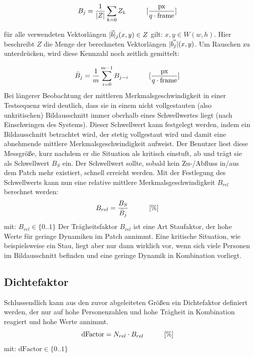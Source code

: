 \begin{equation}
B_j = \frac{1}{|Z|}\sum_{k=0}Z_k \hskip 30pt [\frac{\text{px}}{q\cdot \text{frame}}]
\end{equation}

\begin{flushleft}
für alle verwendeten Vektorlängen $\lvert\vec{b}\rvert_j(x,y)\in Z$ gilt: $x,y\in W(w,h)$.\vskip 5pt
Hier beschreibt $Z$ die Menge der berechneten Vektorlängen $\lvert\vec{b_j}\rvert(x,y)$.\vskip 5pt
Um Rauschen zu unterdrücken, wird diese Kennzahl noch zeitlich gemittelt:
\end{flushleft}
\begin{equation}
\bar{B}_j = \frac{1}{m}\sum_{i=0}^{m-1}B_{j-i} \hskip 30pt [\frac{\text{px}}{q\cdot \text{frame}}]
\end{equation}
\vskip 5pt
Bei längerer Beobachtung der mittleren Merkmalsgeschwindigkeit in einer Testsequenz wird deutlich, dass sie in einem nicht vollgestauten (also unkritischen) Bildausschnitt immer oberhalb eines Schwellwertes liegt (nach Einschwingen des Systems). Dieser Schwellwert kann festgelegt werden, indem \zb ein Bildausschnitt betrachtet wird, der stetig vollgestaut wird und damit eine abnehmende mittlere Merkmalsgeschwindigkeit aufweist. Der Benutzer liest diese Messgröße, kurz nachdem er die Situation als kritisch einstuft, ab und trägt sie als Schwellwert $B_S$ ein. Der Schwellwert sollte, sobald kein Zu-/Abfluss in/aus dem Patch mehr existiert, schnell erreicht werden. Mit der Festlegung des Schwellwerts kann nun eine relative mittlere Merkmalsgeschwindigkeit $B_{rel}$ berechnet werden:
\newpage
\begin{equation}
    B_{rel}=\frac{B_S}{\bar{B}_j} \hskip 30pt [\%]
\end{equation}
mit: $B_{rel}\in \{0..1\}$
\vskip 10pt
Der Trägheitsfaktor $B_{rel}$ ist eine Art Staufaktor, der hohe Werte für geringe Dynamiken im Patch annimmt. Eine kritische Situation, wie beispielsweise ein Stau, liegt aber nur dann wirklich vor, wenn sich viele Personen im Bildausschnitt befinden und eine geringe Dynamik in Kombination vorliegt.

\subsection{Dichtefaktor}
Schlussendlich kann aus den zuvor abgeleiteten Größen ein Dichtefaktor definiert werden, der nur auf hohe Personenzahlen und hohe Trägheit in Kombination reagiert und hohe Werte annimmt.\vskip 5pt
\begin{equation}
\text{dFactor} = N_{rel}\cdot B_{rel} \hskip 30pt [\%]
\end{equation}
mit: $\text{dFactor}\in \{0..1\}$
\vskip 10pt

